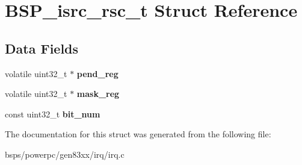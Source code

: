 \hypertarget{structBSP__isrc__rsc__t}{}\section{B\+S\+P\+\_\+isrc\+\_\+rsc\+\_\+t Struct Reference}
\label{structBSP__isrc__rsc__t}
\subsection*{Data Fields}
\begin{DoxyCompactItemize}
\item 
\mbox{\label{structBSP__isrc__rsc__t_ac0af3cc72a511ae8363c92128e043aab}} 
volatile uint32\+\_\+t $\ast$ {\bfseries pend\+\_\+reg}
\item 
\mbox{\label{structBSP__isrc__rsc__t_a83474e7f4df0bf1eb43dabb11a591c21}} 
volatile uint32\+\_\+t $\ast$ {\bfseries mask\+\_\+reg}
\item 
\mbox{\label{structBSP__isrc__rsc__t_a033f7d67d775d5227ac0e66de8ae0168}} 
const uint32\+\_\+t {\bfseries bit\+\_\+num}
\end{DoxyCompactItemize}


The documentation for this struct was generated from the following file\+:\begin{DoxyCompactItemize}
\item 
bsps/powerpc/gen83xx/irq/irq.\+c\end{DoxyCompactItemize}
